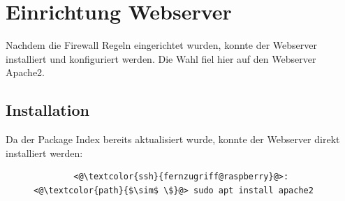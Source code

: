 \documentclass[a4paper, 11pt]{scrartcl}
\begin{document}
\section{Einrichtung Webserver}
Nachdem die Firewall Regeln eingerichtet wurden, konnte der Webserver installiert und konfiguriert werden. Die Wahl fiel hier auf den Webserver Apache2.

\subsection{Installation}
Da der Package Index bereits aktualisiert wurde, konnte der Webserver direkt installiert werden:
\begin{figure}[H]
    \begin{mdframed}[backgroundcolor=bbg]
        \begin{lstlisting}
        <@\textcolor{ssh}{fernzugriff@raspberry}@>:<@\textcolor{path}{$\sim$ \$}@> sudo apt install apache2
        \end{lstlisting}
    \end{mdframed}
    \label{lst:apache_install}
\end{figure}
\end{document}
